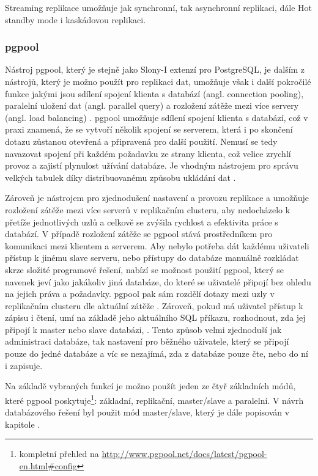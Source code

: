Streaming replikace umožňuje jak synchronní, tak asynchronní replikaci, dále Hot standby mode i kaskádovou replikaci.

      \subsubsection{pgpool}
      \label{kpgpool}

      Nástroj pgpool, který je stejně jako Slony-I extenzí pro PostgreSQL, je dalším z nástrojů, který je možno použít pro replikaci dat, umožňuje však i další pokročilé funkce jakými jsou sdílení spojení klienta s databází (angl. connection pooling), paralelní uložení dat (angl. parallel query) a rozložení zátěže mezi více servery (angl. load balancing) . 
pgpool umožňuje sdílení spojení klienta s databází, což v praxi znamená, že se vytvoří několik spojení se serverem, která i po skončení dotazu zůstanou otevřená a připravená pro další použití. Nemusí se tedy navazovat spojení při každém požadavku ze strany klienta, což velice zrychlí provoz a zajistí plynulost užívání databáze. Je vhodným nástrojem pro správu velkých tabulek díky distribuovanému způsobu ukládání dat \citep{pgpool2014}. 

Zároveň je nástrojem pro zjednodušení nastavení a provozu replikace a umožňuje rozložení zátěže mezi více serverů v replikačním clusteru, aby nedocházelo k přetíže jednotlivých uzlů a celkově se zvýšila rychlost a efektivita práce s databází. V případě rozložení zátěže se pgpool stává prostředníkem pro komunikaci mezi klientem a serverem. Aby nebylo potřeba dát každému uživateli přístup k jinému slave serveru, nebo přístupy do databáze manuálně rozkládat skrze složité programové řešení, nabízí se možnost použití pgpool, který se navenek jeví jako jakákoliv jiná databáze, do které se uživatelé připojí bez ohledu na jejich práva a požadavky. pgpool pak sám rozdělí dotazy mezi uzly v replikačním clusteru dle aktuální zátěže \citep{Boszormenyi2013}. Zároveň, pokud má uživatel přístup k zápisu i čtení, umí na základě jeho aktuálního SQL příkazu, rozhodnout, zda jej připojí k master nebo slave databázi, . Tento způsob velmi zjednoduší jak administraci databáze, tak nastavení pro běžného uživatele, který se připojí pouze do jedné databáze a víc se nezajímá, zda z databáze pouze čte, nebo do ní i zapisuje. 

Na základě vybraných funkcí je možno použít jeden ze čtyř základních módů, které pgpool poskytuje\footnote{kompletní přehled na \url{http://www.pgpool.net/docs/latest/pgpool-en.html\#config}}: základní, replikační, master/slave a paralelní. V návrh databázového řešení byl použit mód master/slave, který je dále popisován v kapitole .

